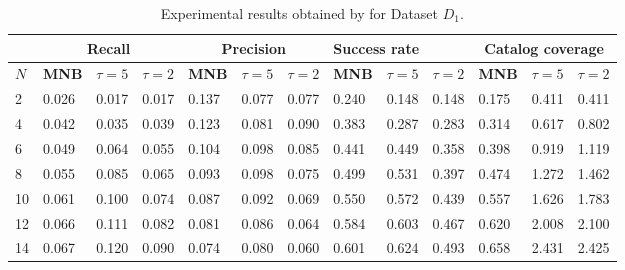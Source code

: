 \begin{table*}[t!]
	\small
\caption{Experimental results obtained by \TFb for Dataset $D_{1}$.}
\begin{tabular}{|l | lll| lll |lll |lll|}
	\hline
	& \multicolumn{3}{c|}{\textbf{Recall}} & \multicolumn{3}{c|}{\textbf{Precision}} & \multicolumn{3}{l|}{\textbf{Success rate}} & \multicolumn{3}{c|}{ \textbf{Catalog coverage}} \\ \hline
	$N$  & \textbf{MNB}     & $\tau=5$   & $\tau=2$  & \textbf{MNB}      & $\tau=5$   & $\tau=2$   & \textbf{MNB}       & $\tau=5$   & $\tau=2$    & \textbf{MNB}        & $\tau=5$     & $\tau=2$      \\ \hline
                   
2                  & 0.026 & 0.017             & 0.017             & 0.137 & 0.077             & 0.077             & 0.240 & 0.148             & 0.148             & 0.175 & 0.411             & 0.411             \\ \hline
4                  & 0.042 & 0.035             & 0.039             & 0.123 & 0.081             & 0.090             & 0.383 & 0.287             & 0.283             & 0.314 & 0.617             & 0.802             \\ \hline
6                  & 0.049 & 0.064             & 0.055             & 0.104 & 0.098             & 0.085             & 0.441 & 0.449             & 0.358             & 0.398 & 0.919             & 1.119             \\ \hline
\rowcolor{Gray}
8                  & 0.055 & 0.085             & 0.065             & 0.093 & 0.098             & 0.075             & 0.499 & 0.531             & 0.397             & 0.474 & 1.272             & 1.462             \\ \hline
10                 & 0.061 & 0.100             & 0.074             & 0.087 & 0.092             & 0.069             & 0.550 & 0.572             & 0.439             & 0.557 & 1.626             & 1.783             \\ \hline
12                 & 0.066 & 0.111             & 0.082             & 0.081 & 0.086             & 0.064             & 0.584 & 0.603             & 0.467             & 0.620 & 2.008             & 2.100             \\ \hline
14                 & 0.067 & 0.120             & 0.090             & 0.074 & 0.080             & 0.060             & 0.601 & 0.624             & 0.493             & 0.658 & 2.431             & 2.425             \\ \hline

\end{tabular}
\end{table*}
